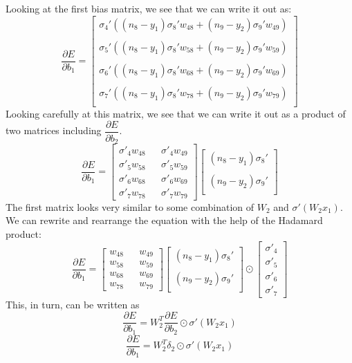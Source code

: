 \documentclass{article}
\begin{document}
Looking at the first bias matrix, we see that we can write it out as:
\[
\dfrac{\partial E}{\partial b_1} =
\begin{bmatrix}
    \sigma_4'((n_8-y_1)\sigma_8'w_{48} + (n_9-y_2)\sigma_9'w_{49}) \\ \\
    \sigma_5'((n_8-y_1)\sigma_8'w_{58} + (n_9-y_2)\sigma_9'w_{59}) \\ \\
    \sigma_6'((n_8-y_1)\sigma_8'w_{68} + (n_9-y_2)\sigma_9'w_{69}) \\ \\
    \sigma_7'((n_8-y_1)\sigma_8'w_{78} + (n_9-y_2)\sigma_9'w_{79}) \\
\end{bmatrix}
\]
Looking carefully at this matrix, we see that we can write it out as a product of two matrices including $\dfrac{\partial E}{\partial b_2}$.
\[
\dfrac{\partial E}{\partial b_1} =
\begin{bmatrix}
    \sigma'_4w_{48} && \sigma'_4w_{49} \\
    \sigma'_5w_{58} && \sigma'_5w_{59} \\
    \sigma'_6w_{68} && \sigma'_6w_{69} \\
    \sigma'_7w_{78} && \sigma'_7w_{79}
\end{bmatrix}
\begin{bmatrix}
    (n_8-y_1)\sigma_8' \\ \\
    (n_9-y_2)\sigma_9' \\
\end{bmatrix}
\]
The first matrix looks very similar to some combination of $W_2$ and $\sigma'(W_2x_1)$. We can rewrite and rearrange the equation with the help of the Hadamard product:
\[
\dfrac{\partial E}{\partial b_1} =
\begin{bmatrix}
    w_{48} && w_{49} \\
    w_{58} && w_{59} \\
    w_{68} && w_{69} \\
    w_{78} && w_{79}
\end{bmatrix}
\begin{bmatrix}
    (n_8-y_1)\sigma_8' \\ \\
    (n_9-y_2)\sigma_9' \\
\end{bmatrix}
\odot
\begin{bmatrix}
    \sigma'_4 \\
    \sigma'_5 \\
    \sigma'_6 \\
    \sigma'_7
\end{bmatrix}
\]
This, in turn, can be written as
\[
\dfrac{\partial E}{\partial b_1} =
W_2^T\dfrac{\partial E}{\partial b_2} \odot \sigma'(W_2x_1)
\]
\[
\dfrac{\partial E}{\partial b_1} =
W_2^T\delta_2 \odot \sigma'(W_2x_1)
\]
\end{document}
